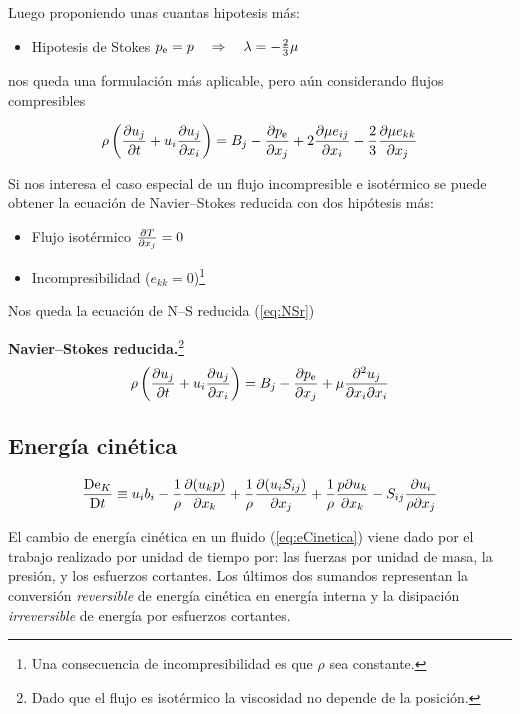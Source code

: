Luego proponiendo unas cuantas hipotesis más:
\begin{itemize}
\item Hipotesis de Stokes $\pe=p\quad\Rightarrow\quad\lambda = -\frac{2}{3}\mu$
\end{itemize}
nos queda una formulación más aplicable, pero aún considerando flujos compresibles

\begin{equation}\label{eq:NS_stokesHipotesis}
     \rho \left( \spartial{u_j}{t}+u_i \spartial{u_j}{x_i}\right)=B_j-\spartial{\pe}{x_j}+2\spartial{\mu e_{ij}}{x_i}-\frac{2}{3}\spartial{\mu e_{kk}}{x_j}
\end{equation}

Si nos interesa el caso especial de un flujo incompresible e isotérmico se puede obtener la ecuación de Navier--Stokes reducida con dos hipótesis más:
\begin{itemize}
    \item Flujo isotérmico $\frac{\partial T}{\partial x_j}=0$
    \item Incompresibilidad ($e_{kk}=0$)\footnote{Una consecuencia de incompresibilidad es que $\rho$ sea constante.}
\end{itemize}
Nos queda la ecuación de N--S reducida (\ref{eq:NSr})
\begin{mdframed}
\textbf{Navier--Stokes reducida.}\footnote{Dado que el flujo es isotérmico la viscosidad no depende de la posición.}
\begin{equation}\label{eq:NSr}
\rho \left( \spartial{u_j}{t} +u_i \spartial{u_j}{x_i}\right)=B_j-\spartial{\pe}{x_j} +\mu \spartial{^2 u_j}{x_i\partial x_i}
\end{equation}
\end{mdframed}



\subsection{Energía cinética}

\begin{equation}\label{eq:eCinetica}
\frac{\textrm{D} \textrm{e}_K}{\textrm{D} t}\equiv u_i b_i-\frac{1}{\rho}\frac{\partial (u_k p)}{\partial x_k} +\frac{1}{\rho} \frac{\partial (u_i S_{ij})}{\partial x_j}+\frac{1}{\rho} \frac{p\partial u_k}{\partial x_k}-S_{ij} \frac{\partial u_i}{\rho \partial x_j}
\end{equation}

El cambio de energía cinética en un fluido (\ref{eq:eCinetica}) viene dado por el trabajo realizado por unidad de tiempo por: las fuerzas por unidad de masa, la presión, y los esfuerzos cortantes. Los últimos dos sumandos representan la conversión \emph{reversible} de energía cinética en energía interna y la disipación \emph{irreversible} de energía por esfuerzos cortantes.
